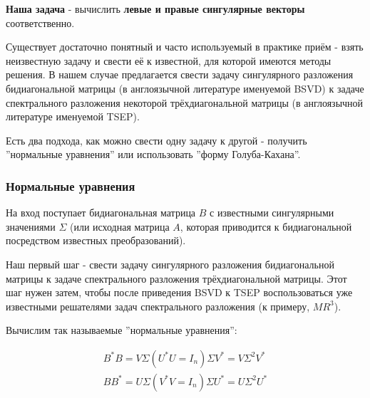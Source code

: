 \textbf{Наша задача} - вычислить \textbf{левые и правые сингулярные векторы} соответственно.

Существует достаточно понятный и часто используемый в практике приём - взять неизвестную задачу и свести её к известной, для которой имеются методы решения. В нашем случае предлагается свести задачу сингулярного разложения бидиагональной матрицы (в англоязычной литературе именуемой BSVD) к задаче спектрального разложения некоторой трёхдиагональной матрицы (в англоязычной литературе именуемой TSEP).

Есть два подхода, как можно свести одну задачу к другой - получить ''нормальные уравнения'' или использовать ''форму Голуба-Кахана''.



\subsubsection{Нормальные уравнения}

На вход поступает бидиагональная матрица $B$ с известными сингулярными значениями $\Sigma$ (или исходная матрица $A$, которая приводится к бидиагональной посредством известных преобразований).

Наш первый шаг - свести задачу сингулярного разложения бидиагональной матрицы к задаче спектрального разложения трёхдиагональной матрицы. Этот шаг нужен затем, чтобы после приведения BSVD к TSEP воспользоваться уже известными решателями задач спектрального разложения (к примеру, $MR^3$).

Вычислим так называемые ''нормальные уравнения'':

\begin{equation} \label{Norm_eq}
    \begin{split}
        B^*B=V \Sigma (U^*U=I_n) \Sigma V^*=V \Sigma^2 V^*\\
        BB^*=U\Sigma (V^* V=I_n) \Sigma U^*=U \Sigma^2 U^*
    \end{split}
\end{equation}

